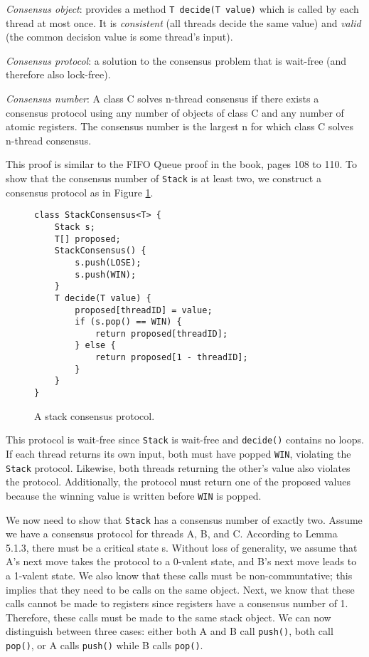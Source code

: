 \documentclass[a4paper,10pt]{article}
\begin{document}
\vspace{3mm}

\emph{Consensus object}: provides a method \lstinline|T decide(T value)| which is called by each thread at most once. It is \emph{consistent} (all threads decide the same value) and \emph{valid} (the common decision value is some thread's input).

\emph{Consensus protocol}: a solution to the consensus problem that is wait-free (and therefore also lock-free).

\emph{Consensus number}: A class C solves n-thread consensus if there exists a consensus protocol using any number of objects of class C and any number of atomic registers. The consensus number is the largest n for which class C solves n-thread consensus.

This proof is similar to the FIFO Queue proof in the book, pages 108 to 110. To show that the consensus number of \lstinline|Stack| is at least two, we construct a consensus protocol as in Figure \ref{fig:stackconsensus}.

\begin{figure}
\begin{lstlisting}
class StackConsensus<T> {
    Stack s;
    T[] proposed;
    StackConsensus() {
        s.push(LOSE);
        s.push(WIN);
    }
    T decide(T value) {
        proposed[threadID] = value;
        if (s.pop() == WIN) {
            return proposed[threadID];
        } else {
            return proposed[1 - threadID];
        }
    }
}
\end{lstlisting}
\caption{A stack consensus protocol.}
\label{fig:stackconsensus}
\end{figure}

This protocol is wait-free since \lstinline|Stack| is wait-free and \lstinline|decide()| contains no loops. If each thread returns its own input, both must have popped \lstinline|WIN|, violating the \lstinline|Stack| protocol. Likewise, both threads returning the other's value also violates the protocol. Additionally, the protocol must return one of the proposed values because the winning value is written before \lstinline|WIN| is popped.

We now need to show that \lstinline|Stack| has a consensus number of exactly two. Assume we have a consensus protocol for threads A, B, and C. According to Lemma 5.1.3, there must be a critical state s. Without loss of generality, we assume that A's next move takes the protocol to a 0-valent state, and B's next move leads to a 1-valent state. We also know that these calls must be non-communtative; this implies that they need to be calls on the same object. Next, we know that these calls cannot be made to registers since registers have a consensus number of 1. Therefore, these calls must be made to the same stack object. We can now distinguish between three cases: either both A and B call \lstinline|push()|, both call \lstinline|pop()|, or A calls \lstinline|push()| while B calls \lstinline|pop()|.
\end{document}
